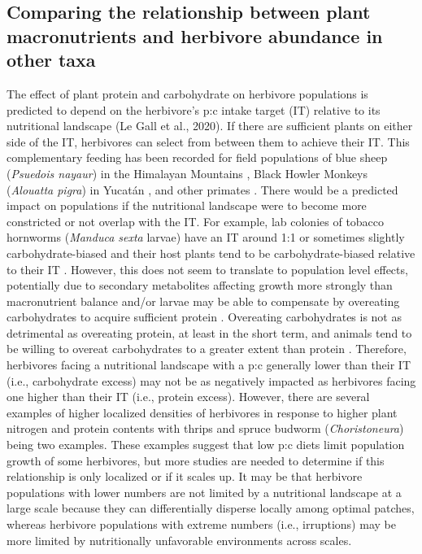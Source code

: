 \documentclass[
]{article}
\begin{document}
\subsection{Comparing the relationship between plant macronutrients and
herbivore abundance in other
taxa}\label{comparing-the-relationship-between-plant-macronutrients-and-herbivore-abundance-in-other-taxa}

The effect of plant protein and carbohydrate on herbivore populations is
predicted to depend on the herbivore's p:c intake target (IT) relative
to its nutritional landscape (Le Gall et al., 2020). If there are
sufficient plants on either side of the IT, herbivores can select from
between them to achieve their IT. This complementary feeding has been
recorded for field populations of blue sheep (\emph{Psuedois nayaur}) in
the Himalayan Mountains \citep{aryal_foods_2015}, Black Howler Monkeys
(\emph{Alouatta pigra}) in Yucatán \citep{bridgeman_feeding_2012}, and
other primates \citep{raubenheimer_nutritional_2013}. There would be a
predicted impact on populations if the nutritional landscape were to
become more constricted or not overlap with the IT. For example, lab
colonies of tobacco hornworms (\emph{Manduca sexta} larvae) have an IT
around 1:1 or sometimes slightly carbohydrate-biased
\citep{wilson_dietary_2019} and their host plants tend to be
carbohydrate-biased relative to their IT
\citep{wilson_nutritional_2019}. However, this does not seem to
translate to population level effects, potentially due to secondary
metabolites affecting growth more strongly than macronutrient balance
and/or larvae may be able to compensate by overeating carbohydrates to
acquire sufficient protein \citep{wilson_dietary_2019}. Overeating
carbohydrates is not as detrimental as overeating protein, at least in
the short term, and animals tend to be willing to overeat carbohydrates
to a greater extent than protein
\citep{cheng_geometry_2008, simpson_nature_2012}. Therefore, herbivores
facing a nutritional landscape with a p:c generally lower than their IT
(i.e., carbohydrate excess) may not be as negatively impacted as
herbivores facing one higher than their IT (i.e., protein excess).
However, there are several examples of higher localized densities of
herbivores in response to higher plant nitrogen and protein contents
with thrips \citep{brown_relationship_2002} and spruce budworm
(\emph{Choristoneura}) \citep{de_grandpre_defoliation-induced_2022}
being two examples. These examples suggest that low p:c diets limit
population growth of some herbivores, but more studies are needed to
determine if this relationship is only localized or if it scales up. It
may be that herbivore populations with lower numbers are not limited by
a nutritional landscape at a large scale because they can differentially
disperse locally among optimal patches, whereas herbivore populations
with extreme numbers (i.e., irruptions) may be more limited by
nutritionally unfavorable environments across scales.
\end{document}
